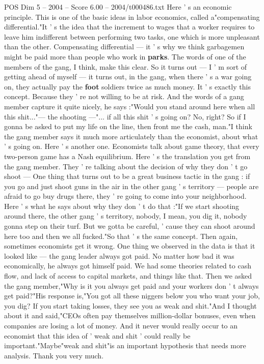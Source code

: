 \begin{textsample}{POS Dim 5 – 2004 – Score 6.00 – 2004/t000486.txt}
Here ' s an economic principle.
This is one of the basic ideas in labor economics, called a"compensating differential."It ' s the idea that the increment to wages that a worker requires to leave him indifferent between performing two tasks, one which is more unpleasant than the other.
Compensating differential — it ' s why we think garbagemen might be paid more than people who work in \textbf{parks}.
The words of one of the members of the gang, I think, make this clear.
So it turns out — I ' m sort of getting ahead of myself — it turns out, in the gang, when there ' s a war going on, they actually pay the \textbf{foot} soldiers twice as much money.
It ' s exactly this concept.
Because they ' re not willing to be at risk.
And the words of a gang member capture it quite nicely, he says :"Would you stand around here when all this shit..."— the shooting —"... if all this shit ' s going on?
No, right?
So if I gonna be asked to put my life on the line, then front me the cash, man."I think the gang member says it much more articulately than the economist, about what ' s going on.
Here ' s another one.
Economists talk about game theory, that every two-person game has a Nash equilibrium.
Here ' s the translation you get from the gang member.
They ' re talking about the decision of why they don ' t go shoot — One thing that turns out to be a great business tactic in the gang : if you go and just shoot guns in the air in the other gang ' s territory — people are afraid to go buy drugs there, they ' re going to come into your neighborhood.
Here ' s what he says about why they don ' t do that :"If we start shooting around there, the other gang ' s territory, nobody, I mean, you dig it, nobody gonna step on their turf.
But we gotta be careful, ' cause they can shoot around here too and then we all fucked."So that ' s the same concept.
Then again, sometimes economists get it wrong.
One thing we observed in the data is that it looked like — the gang leader always got paid.
No matter how bad it was economically, he always got himself paid.
We had some theories related to cash flow, and lack of access to capital markets, and things like that.
Then we asked the gang member,"Why is it you always get paid and your workers don ' t always get paid?"His response is,"You got all these niggers below you who want your job, you dig?
If you start taking losses, they see you as weak and shit."And I thought about it and said,"CEOs often pay themselves million-dollar bonuses, even when companies are losing a lot of money.
And it never would really occur to an economist that this idea of ' weak and shit ' could really be important."Maybe"weak and shit"is an important hypothesis that needs more analysis.
Thank you very much.

\end{textsample}
